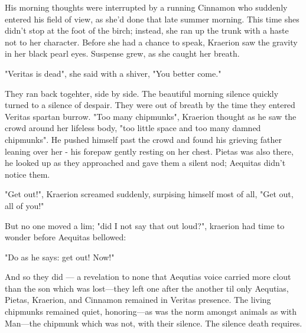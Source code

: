 His morning thoughts were interrupted by a running Cinnamon who suddenly entered his field of view, as she'd done that late summer morning. This time shes didn't stop at the foot of the birch; instead, she ran up the trunk with a haste not to her character. Before she had a chance to speak, Kraerion saw the gravity in her black pearl eyes. Suspense grew, as she caught her breath.

"Veritas is dead", she said with a shiver, "You better come."


They ran back togehter, side by side. The beautiful morning silence quickly turned to a silence of despair. They were out of breath by the time they entered Veritas spartan burrow. "Too many chipmunks", Kraerion thought as he saw the crowd around her lifeless body, "too little space and too many damned chipmunks". He pushed himself past the crowd and found his grieving father leaning over her - his forepaw gently resting on her chest. Pietas was also there, he looked up as they approached and gave them a silent nod; Aequitas didn't notice them.

"Get out!", Kraerion screamed suddenly, surpising himself most of all, "Get out, all of you!"

But no one moved a lim; "did I not say that out loud?", kraerion had time to wonder before Aequitas bellowed:

"Do as he says: get out! Now!"

And so they did — a revelation to none that Aequtias voice carried more clout than the son which was lost—they left one after the another til only Aequtias, Pietas, Kraerion, and Cinnamon remained in Veritas presence. The living chipmunks remained quiet, honoring—as was the norm amongst animals as with Man—the chipmunk which was not, with their silence. The silence death requires.


